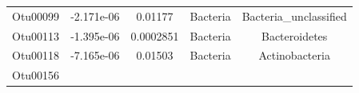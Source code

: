 \documentclass[]{article}
\begin{document}
\begin{longtable}[]{@{}ccccc@{}}
\begin{minipage}[t]{0.13\columnwidth}
Otu00099\strut
\end{minipage} & \begin{minipage}[t]{0.16\columnwidth}\centering\strut
-2.171e-06\strut
\end{minipage} & \begin{minipage}[t]{0.14\columnwidth}\centering\strut
0.01177\strut
\end{minipage} & \begin{minipage}[t]{0.13\columnwidth}\centering\strut
Bacteria\strut
\end{minipage} & \begin{minipage}[t]{0.27\columnwidth}\centering\strut
Bacteria\_unclassified\strut
\end{minipage}\tabularnewline
\begin{minipage}[t]{0.13\columnwidth}\centering\strut
Otu00113\strut
\end{minipage} & \begin{minipage}[t]{0.16\columnwidth}\centering\strut
-1.395e-06\strut
\end{minipage} & \begin{minipage}[t]{0.14\columnwidth}\centering\strut
0.0002851\strut
\end{minipage} & \begin{minipage}[t]{0.13\columnwidth}\centering\strut
Bacteria\strut
\end{minipage} & \begin{minipage}[t]{0.27\columnwidth}\centering\strut
Bacteroidetes\strut
\end{minipage}\tabularnewline
\begin{minipage}[t]{0.13\columnwidth}\centering\strut
Otu00118\strut
\end{minipage} & \begin{minipage}[t]{0.16\columnwidth}\centering\strut
-7.165e-06\strut
\end{minipage} & \begin{minipage}[t]{0.14\columnwidth}\centering\strut
0.01503\strut
\end{minipage} & \begin{minipage}[t]{0.13\columnwidth}\centering\strut
Bacteria\strut
\end{minipage} & \begin{minipage}[t]{0.27\columnwidth}\centering\strut
Actinobacteria\strut
\end{minipage}\tabularnewline
\begin{minipage}[t]{0.13\columnwidth}\centering\strut
Otu00156\strut
\end{minipage} & \begin{minipage}[t]{0.16\columnwidth}\centering\strut

\end{minipage}
\end{longtable}
\end{document}
